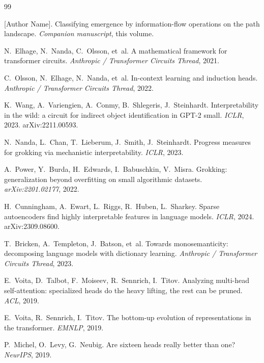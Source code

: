 \documentclass[11pt,a4paper]{article}
\begin{document}
\begin{thebibliography}{99}

[Author Name].
Classifying emergence by information-flow operations on the path
landscape.
\emph{Companion manuscript}, this volume.

N.~Elhage, N.~Nanda, C.~Olsson, et~al.
A mathematical framework for transformer circuits.
\emph{Anthropic / Transformer Circuits Thread}, 2021.

C.~Olsson, N.~Elhage, N.~Nanda, et~al.
In-context learning and induction heads.
\emph{Anthropic / Transformer Circuits Thread}, 2022.

K.~Wang, A.~Variengien, A.~Conmy, B.~Shlegeris, J.~Steinhardt.
Interpretability in the wild: a circuit for indirect object
identification in GPT-2 small.
\emph{ICLR}, 2023. arXiv:2211.00593.

N.~Nanda, L.~Chan, T.~Lieberum, J.~Smith, J.~Steinhardt.
Progress measures for grokking via mechanistic interpretability.
\emph{ICLR}, 2023.

A.~Power, Y.~Burda, H.~Edwards, I.~Babuschkin, V.~Misra.
Grokking: generalization beyond overfitting on small algorithmic
datasets.
\emph{arXiv:2201.02177}, 2022.

H.~Cunningham, A.~Ewart, L.~Riggs, R.~Huben, L.~Sharkey.
Sparse autoencoders find highly interpretable features in language
models.
\emph{ICLR}, 2024. arXiv:2309.08600.

T.~Bricken, A.~Templeton, J.~Batson, et~al.
Towards monosemanticity: decomposing language models with
dictionary learning.
\emph{Anthropic / Transformer Circuits Thread}, 2023.

E.~Voita, D.~Talbot, F.~Moiseev, R.~Sennrich, I.~Titov.
Analyzing multi-head self-attention: specialized heads do the heavy
lifting, the rest can be pruned.
\emph{ACL}, 2019.

E.~Voita, R.~Sennrich, I.~Titov.
The bottom-up evolution of representations in the transformer.
\emph{EMNLP}, 2019.

P.~Michel, O.~Levy, G.~Neubig.
Are sixteen heads really better than one?
\emph{NeurIPS}, 2019.


\end{thebibliography}
\end{document}
